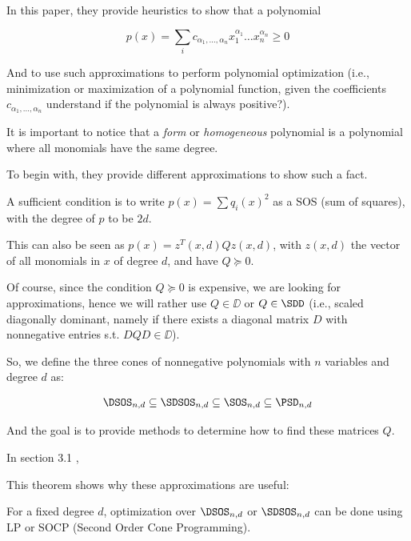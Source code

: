 

In this paper, they provide heuristics to show that a polynomial 

\[p(x)=\sum_i c_{\alpha_1,\dots,\alpha_n}x_1^{\alpha_1}\dots x_n^{\alpha_n} \geq 0\]

And to use such approximations to perform polynomial optimization (i.e., minimization or maximization of a polynomial function, given the coefficients $c_{\alpha_1,\dots,\alpha_n}$ understand if the polynomial is always positive?).

It is important to notice that a \textit{form} or \textit{homogeneous} polynomial is a polynomial where all monomials have the same degree.

To begin with, they provide different approximations to show such a fact.

A sufficient condition is to write $p(x) = \sum q_i(x)^2$ as a SOS (sum of squares), with the degree of $p$ to be $2d$.

This can also be seen as $p(x) = z^T(x,d) Q z(x, d)$, with $z(x,d)$ the vector of all monomials in $x$ of degree $d$, and have $Q \succeq 0$.

Of course, since the condition $Q \succeq 0$ is expensive, we are looking for approximations, hence we will rather use $Q \in \DD$ or $Q \in \SDD$ (i.e., scaled diagonally dominant, namely if there exists a diagonal matrix $D$ with nonnegative entries s.t. $D Q D\in \DD$).

So, we define the three cones of nonnegative polynomials with $n$ variables and degree $d$ as:

\begin{align}
	\DSOS_{n,d} \subseteq \SDSOS_{n,d} \subseteq \SOS_{n,d} \subseteq \PSD_{n,d}
\end{align}

And the goal is to provide methods to determine how to find these matrices $Q$.

In section 3.1 , 

This theorem shows why these approximations are useful:

\begin{theorem}
\label{thm:poly_optim_approx_is_lp}
	For a fixed degree $d$, optimization over $\DSOS_{n,d}$ or $\SDSOS_{n,d}$ can be done using LP or SOCP (Second Order Cone Programming).
\end{theorem}

